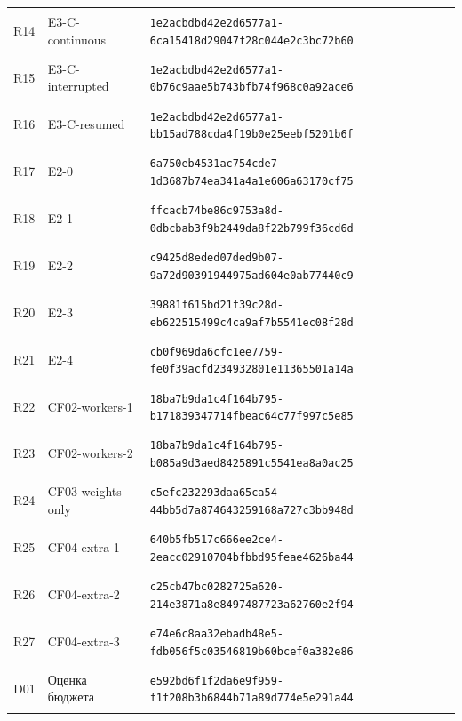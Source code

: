 \begin{longtable}{@{}l>{\raggedright\arraybackslash}p{3.7cm}p{10.8cm}@{}}
\hypertarget{R14}{R14} & E3-C-continuous & {\fontsize{9.2}{11}\selectfont\texttt{1e2acbdbd42e2d6577a1-6ca15418d29047f28c044e2c3bc72b60}} \\
\hypertarget{R15}{R15} & E3-C-interrupted & {\fontsize{9.2}{11}\selectfont\texttt{1e2acbdbd42e2d6577a1-0b76c9aae5b743bfb74f968c0a92ace6}} \\
\hypertarget{R16}{R16} & E3-C-resumed & {\fontsize{9.2}{11}\selectfont\texttt{1e2acbdbd42e2d6577a1-bb15ad788cda4f19b0e25eebf5201b6f}} \\
\hypertarget{R17}{R17} & E2-0 & {\fontsize{9.2}{11}\selectfont\texttt{6a750eb4531ac754cde7-1d3687b74ea341a4a1e606a63170cf75}} \\
\hypertarget{R18}{R18} & E2-1 & {\fontsize{9.2}{11}\selectfont\texttt{ffcacb74be86c9753a8d-0dbcbab3f9b2449da8f22b799f36cd6d}} \\
\hypertarget{R19}{R19} & E2-2 & {\fontsize{9.2}{11}\selectfont\texttt{c9425d8eded07ded9b07-9a72d90391944975ad604e0ab77440c9}} \\
\hypertarget{R20}{R20} & E2-3 & {\fontsize{9.2}{11}\selectfont\texttt{39881f615bd21f39c28d-eb622515499c4ca9af7b5541ec08f28d}} \\
\hypertarget{R21}{R21} & E2-4 & {\fontsize{9.2}{11}\selectfont\texttt{cb0f969da6cfc1ee7759-fe0f39acfd234932801e11365501a14a}} \\
\hypertarget{R22}{R22} & CF02-workers-1 & {\fontsize{9.2}{11}\selectfont\texttt{18ba7b9da1c4f164b795-b171839347714fbeac64c77f997c5e85}} \\
\hypertarget{R23}{R23} & CF02-workers-2 & {\fontsize{9.2}{11}\selectfont\texttt{18ba7b9da1c4f164b795-b085a9d3aed8425891c5541ea8a0ac25}} \\
\hypertarget{R24}{R24} & CF03-weights-only & {\fontsize{9.2}{11}\selectfont\texttt{c5efc232293daa65ca54-44bb5d7a874643259168a727c3bb948d}} \\
\hypertarget{R25}{R25} & CF04-extra-1 & {\fontsize{9.2}{11}\selectfont\texttt{640b5fb517c666ee2ce4-2eacc02910704bfbbd95feae4626ba44}} \\
\hypertarget{R26}{R26} & CF04-extra-2 & {\fontsize{9.2}{11}\selectfont\texttt{c25cb47bc0282725a620-214e3871a8e8497487723a62760e2f94}} \\
\hypertarget{R27}{R27} & CF04-extra-3 & {\fontsize{9.2}{11}\selectfont\texttt{e74e6c8aa32ebadb48e5-fdb056f5c03546819b60bcef0a382e86}} \\
\hypertarget{D01}{D01} & Оценка бюджета & {\fontsize{9.2}{11}\selectfont\texttt{e592bd6f1f2da6e9f959-f1f208b3b6844b71a89d774e5e291a44}} \\

\end{longtable}
